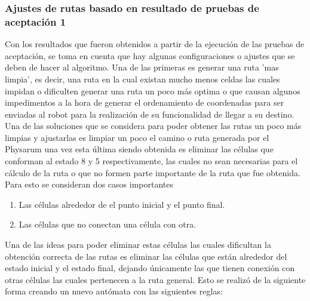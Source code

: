 \subsubsection{Ajustes de rutas basado en resultado de pruebas de aceptaci\'on 1}
    Con los resultados que fueron obtenidos a partir de la
        ejecuci\'on de las pruebas de aceptaci\'on, se toma en cuenta
        que hay algunas configuraciones o ajustes que se deben de
        hacer al algoritmo. Una de las primeras es generar una ruta
        'mas limpia', es decir, una ruta en la cual existan mucho
        menos celdas las cuales impidan o dificulten generar una
        ruta un poco m\'as optima o que causan algunos
        impedimentos a la hora de generar el ordenamiento de
        coordenadas para ser enviadas al robot para la realizaci\'on de
        su funcionalidad de llegar a su destino.    
    \vskip 0.5cm
    Una de las soluciones que se considera para poder obtener
        las rutas un poco m\'as limpias y ajustarlas es limpiar un poco
        el camino o ruta generada por el Physarum una vez esta
        \'ultima siendo obtenida es eliminar las c\'elulas que conforman
        al estado 8 y 5 respectivamente, las cuales no sean
        necesarias para el c\'alculo de la ruta o que no formen parte
        importante de la ruta que fue obtenida. Para esto se
        consideran dos casos importantes
    \vskip 0.5cm
    \begin{enumerate}
        \item Las c\'elulas alrededor de el punto inicial y el punto
            final.
        \item Las c\'elulas que no conectan una c\'elula con otra.
    \end{enumerate}
    \vskip 0.5cm
    Una de las ideas para poder eliminar estas c\'elulas las cuales
        dificultan la obtenci\'on correcta de las rutas es eliminar las
        c\'elulas que est\'an alrededor del estado inicial y el estado
        final, dejando \'unicamente las que tienen conexi\'on con otras
        c\'elulas las cuales pertenecen a la ruta general.
    \vskip 0.5cm
    Esto se realiz\'o de la siguiente forma creando un nuevo
        aut\'omata con las siguientes reglas:
    \vskip 0.5cm
